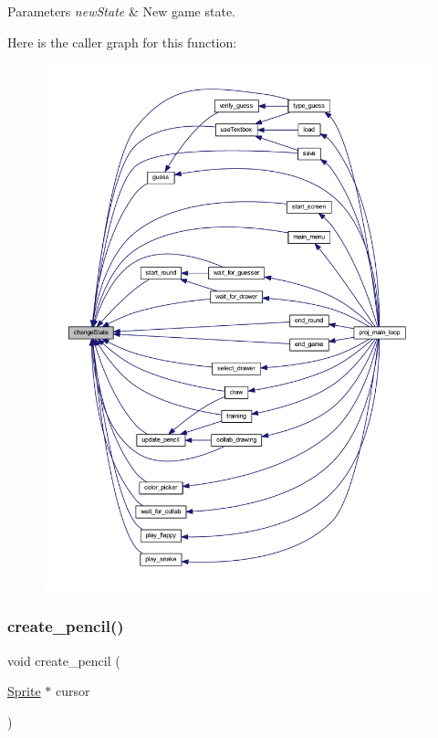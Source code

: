 \begin{DoxyParams}{Parameters}
{\em new\+State} & New game state. \\
\hline
\end{DoxyParams}
Here is the caller graph for this function\+:\nopagebreak
\begin{figure}[H]
\begin{center}
\leavevmode
\includegraphics[width=350pt]{group__game__state_ga903c5ec1f682a02fdf7213d99031ff8b_icgraph}
\end{center}
\end{figure}
\mbox{\label{group__game__state_ga91d8df875d55d73e7d41279389adc390}} 
\subsubsection{\texorpdfstring{create\+\_\+pencil()}{create\_pencil()}}
{\footnotesize\ttfamily void create\+\_\+pencil (\begin{DoxyParamCaption}\item[{\mbox{\hyperlink{struct_sprite}{Sprite}} $\ast$}]{cursor }\end{DoxyParamCaption})}



